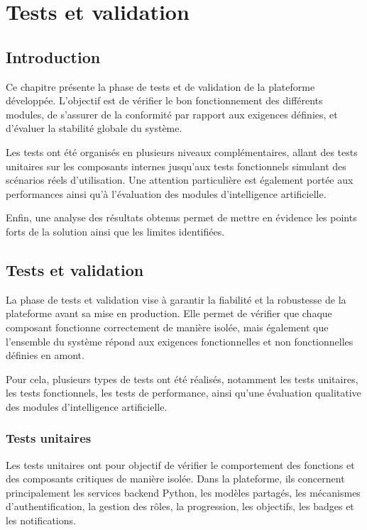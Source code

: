 \chapter{Tests et validation}

\minitoc

\newpage

\section{Introduction}

Ce chapitre présente la phase de tests et de validation de la plateforme développée. L'objectif est de vérifier le bon fonctionnement des différents modules, de s'assurer de la conformité par rapport aux exigences définies, et d'évaluer la stabilité globale du système.

Les tests ont été organisés en plusieurs niveaux complémentaires, allant des tests unitaires sur les composants internes jusqu'aux tests fonctionnels simulant des scénarios réels d'utilisation. Une attention particulière est également portée aux performances ainsi qu'à l'évaluation des modules d'intelligence artificielle.

Enfin, une analyse des résultats obtenus permet de mettre en évidence les points forts de la solution ainsi que les limites identifiées.

\section{Tests et validation}

La phase de tests et validation vise à garantir la fiabilité et la robustesse de la plateforme avant sa mise en production. Elle permet de vérifier que chaque composant fonctionne correctement de manière isolée, mais également que l'ensemble du système répond aux exigences fonctionnelles et non fonctionnelles définies en amont.

Pour cela, plusieurs types de tests ont été réalisés, notamment les tests unitaires, les tests fonctionnels, les tests de performance, ainsi qu'une évaluation qualitative des modules d'intelligence artificielle.

\subsection{Tests unitaires}

Les tests unitaires ont pour objectif de vérifier le comportement des fonctions et des composants critiques de manière isolée. Dans la plateforme, ils concernent principalement les services backend Python, les modèles partagés, les mécanismes d'authentification, la gestion des rôles, la progression, les objectifs, les badges et les notifications.

